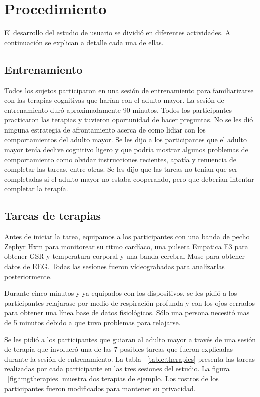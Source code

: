 \section{Procedimiento}\label{secc:methods}
El desarrollo del estudio de usuario se dividi\'o en diferentes actividades. A continuaci\'on se explican a detalle cada una de ellas.
\subsection{Entrenamiento}\label{secc:training}
	Todos los sujetos participaron en una sesi\'on de entrenamiento para familiarizarse con las terapias cognitivas que har\'ian con el adulto mayor. La sesi\'on de entrenamiento dur\'o aproximadamente 90 minutos. Todos los participantes practicaron las terapias y tuvieron oportunidad de hacer preguntas. No se les di\'o ninguna estrategia de afrontamiento acerca de como lidiar con los comportamientos del adulto mayor. Se les dijo a los participantes que el adulto mayor ten\'ia declive cognitivo ligero y que podr\'ia mostrar algunos problemas de comportamiento como olvidar instrucciones recientes, apat\'ia y renuencia de completar las tareas, entre otras. Se les dijo que las tareas no ten\'ian que ser completadas si el adulto mayor no estaba cooperando, pero que deber\'ian intentar completar la terap\'ia.

\subsection{Tareas de terapias}\label{secc:therapytasks}
Antes de iniciar la tarea, equipamos a los participantes con una banda de pecho Zephyr Hxm para monitorear su ritmo card\'iaco, una pulsera Empatica E3 para obtener GSR y temperatura corporal y una banda cerebral Muse para obtener datos de EEG. Todas las sesiones fueron videograbadas para analizarlas posteriormente.

Durante cinco minutos y ya equipados con los dispositivos, se les pidi\'o a los participantes relajarase por medio de respiraci\'on profunda y con los ojos cerrados para obtener una l\'inea base de datos fisiol\'ogicos. S\'olo una persona necesit\'o mas de 5 minutos debido a que tuvo problemas para relajarse.

Se les pidi\'o a los participantes que guiaran al adulto mayor a trav\'es de una sesi\'on de terapia que involucr\'o una de las 7 posibles tareas que fueron explicadas durante la sesi\'on de entrenamiento. La tabla ~\ref{table:therapies} presenta las tareas realizadas por cada participante en las tres sesiones del estudio. La figura ~\ref{fig:imgtherapies} muestra dos terapias de ejemplo. Los rostros de los participantes fueron modificados para mantener su privacidad.

